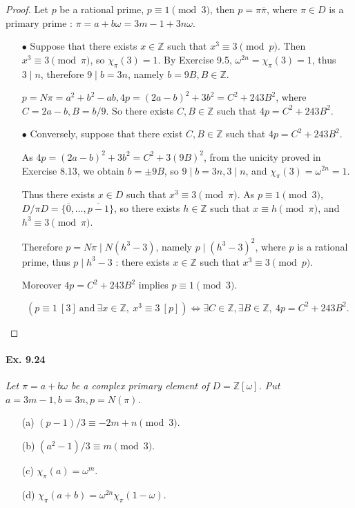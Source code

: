 \documentclass[11pt,a4paper]{article}
\newcommand{\Z}{\mathbb{Z}}
\begin{document}
\begin{proof}
Let $p$ be a rational prime, $p \equiv 1 \pmod 3$, then $p = \pi \overline{\pi}$, where $\pi \in D$ is a primary prime : $\pi = a + b \omega = 3m-1 + 3 n\omega$.
\begin{enumerate}
\item[$\bullet$] Suppose that there exists $x \in \Z$ such that $x^3 \equiv 3 \pmod p$. Then $x^3 \equiv 3 \pmod \pi$, so $\chi_\pi(3) = 1$. By Exercise 9.5, $\omega^{2n} = \chi_\pi(3) = 1$, thus $3 \mid n$, therefore $9 \mid b = 3n$, namely $b = 9B, B \in \Z$.

$p = N\pi = a^2+b^2 -ab, 4p = (2a-b)^2+3b^2 = C^2 + 243 B^2$, where $C = 2a-b,B=b/9$.
So there exists $C,B\in \Z$ such that $4p = C^2 + 243B^2$.
\item[$\bullet$] Conversely, suppose that there exist $C,B \in \Z$ such that $4p = C^2 + 243 B^2$.

As $4p = (2a-b)^2 + 3 b^2 = C^2 + 3(9B)^2$, from the unicity proved in Exercise 8.13, we obtain $b = \pm9B$, so $9 \mid b=3n, 3 \mid n$, and $\chi_\pi(3) = \omega^{2n} = 1$.

Thus there exists $x \in D$ such that $x^3 \equiv 3 \pmod \pi$. As $p \equiv 1\pmod 3$, $D/\pi D = \{\overline{0},\ldots,\overline{p-1}\}$, so there exists $h \in \Z$ such that $x \equiv h \pmod \pi$, and $h^3 \equiv 3 \pmod \pi$.

Therefore $p = N\pi \mid N(h^3 - 3)$, namely $p \mid (h^3-3)^2$, where $p$ is a rational prime, thus $p \mid h^3 -3$ : there exists $x \in \Z$ such that $x^3 \equiv 3 \pmod p$.

Moreover $4p = C^2 + 243 B^2$ implies $p \equiv 1 \pmod 3$.

$$(p\equiv 1 \ [3]\ \mathrm{and}\ \exists x \in \mathbb{Z},\ x^3 \equiv 3 \ [p] )\iff \exists C \in \mathbb{Z}, \exists B \in \mathbb{Z},\ 4p = C^2+243 B^2.$$
\end{enumerate}
\end{proof}

\paragraph{Ex. 9.24}

{\it Let $\pi = a +b \omega$ be a complex primary element of $D = \Z[\omega]$. Put $a = 3m-1,b=3n,p = N(\pi)$.
\begin{enumerate}
\item[(a)] $(p-1)/3 \equiv -2m + n \pmod 3$.
\item[(b)] $(a^2-1)/3 \equiv m \pmod 3$.
\item[(c)] $\chi_\pi(a) = \omega^m$.
\item[(d)] $\chi_\pi(a+b) = \omega^{2n} \chi_\pi(1-\omega)$.
\end{enumerate}
}
\end{document}
